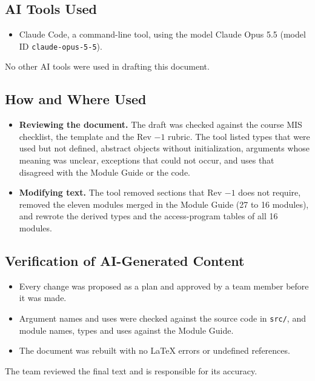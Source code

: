 \documentclass[12pt, titlepage]{article}
\begin{document}
\subsection*{AI Tools Used}

\begin{itemize}
\item Claude Code, a command-line tool, using the model Claude Opus 5.5
  (model ID \texttt{claude-opus-5-5}).
\end{itemize}
No other AI tools were used in drafting this document.

\subsection*{How and Where Used}

\begin{itemize}
\item \textbf{Reviewing the document.} The draft was checked against the course
  MIS checklist, the template and the Rev $-1$ rubric. The tool listed types that
  were used but not defined, abstract objects without initialization, arguments
  whose meaning was unclear, exceptions that could not occur, and uses that
  disagreed with the Module Guide or the code.
\item \textbf{Modifying text.} The tool removed sections that Rev $-1$ does not
  require, removed the eleven modules merged in the Module Guide (27 to 16
  modules), and rewrote the derived types and the access-program tables of all
  16 modules.
\end{itemize}

\subsection*{Verification of AI-Generated Content}

\begin{itemize}
\item Every change was proposed as a plan and approved by a team member before
  it was made.
\item Argument names and uses were checked against the source code in
  \texttt{src/}, and module names, types and uses against the Module Guide.
\item The document was rebuilt with no LaTeX errors or undefined references.
\end{itemize}
The team reviewed the final text and is responsible for its accuracy.



\end{document}
